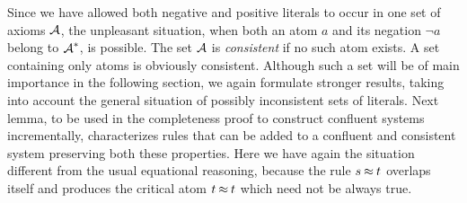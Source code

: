 Since we have allowed both negative and positive literals to occur in 
one set of axioms $\mbox{$\cal A$}$,  the 
unpleasant situation, when both an atom $a$ and its negation $\neg a$ 
belong to
$\mbox{$\cal A$}^\ast$, is possible. The set $\mbox{$\cal A$}$ is {\em consistent} if no such 
atom 
exists. A set containing only atoms is obviously consistent. 
Although such a set will be of main importance in the following section,
we again formulate stronger results, 
taking into account the general situation of possibly inconsistent
sets of literals.
Next lemma, to be used in the completeness proof to construct confluent 
systems incrementally, characterizes rules that can be added to 
a confluent and consistent system preserving both these properties.
Here we  have again the situation different  from the usual 
equational reasoning, because
the rule \(s\mathbin{\approx} t\) overlaps itself and produces the critical atom \(t \mathbin{\approx} t\) 
which need not be always true. 

